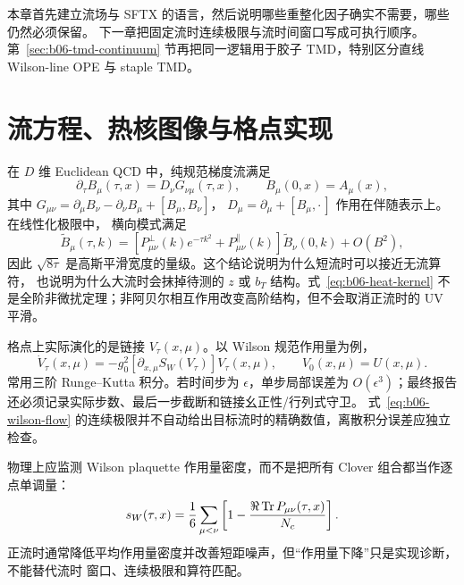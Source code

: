 本章首先建立流场与 SFTX 的语言，然后说明哪些重整化因子确实不需要，哪些仍然必须保留。
下一章把固定流时连续极限与流时间窗口写成可执行顺序。第~\ref{sec:b06-tmd-continuum}
节再把同一逻辑用于胶子 TMD，特别区分直线 Wilson-line OPE 与 staple TMD。

\section{流方程、热核图像与格点实现}

在 \(D\) 维 Euclidean QCD 中，纯规范梯度流满足
\begin{equation}
  \partial_\tau B_\mu(\tau,x)
  =D_\nu G_{\nu\mu}(\tau,x),
  \qquad B_\mu(0,x)=A_\mu(x),
  \label{eq:b06-flow-equation}
\end{equation}
其中 \(G_{\mu\nu}=\partial_\mu B_\nu-\partial_\nu B_\mu+[B_\mu,B_\nu]\)，
\(D_\mu=\partial_\mu+[B_\mu,\cdot\,]\) 作用在伴随表示上。在线性化极限中，
横向模式满足
\begin{equation}
  \widetilde B_\mu(\tau,k)
  =\left[P^\perp_{\mu\nu}(k)e^{-\tau k^2}
  +P^\parallel_{\mu\nu}(k)\right]\widetilde B_\nu(0,k)
  +O(B^2),
  \label{eq:b06-heat-kernel}
\end{equation}
因此 \(\sqrt{8\tau}\) 是高斯平滑宽度的量级。这个结论说明为什么短流时可以接近无流算符，
也说明为什么大流时会抹掉待测的 \(z\) 或 \(b_T\) 结构。式~\eqref{eq:b06-heat-kernel}
不是全阶非微扰定理；非阿贝尔相互作用改变高阶结构，但不会取消正流时的 UV 平滑。

格点上实际演化的是链接 \(V_\tau(x,\mu)\)。以 Wilson 规范作用量为例，
\begin{equation}
  \dot V_\tau(x,\mu)
  =-g_0^2\left[\partial_{x,\mu}S_W(V_\tau)\right]V_\tau(x,\mu),
  \qquad V_0(x,\mu)=U(x,\mu).
  \label{eq:b06-wilson-flow}
\end{equation}
常用三阶 Runge--Kutta 积分。若时间步为 \(\epsilon\)，单步局部误差为
\(O(\epsilon^3)\)；最终报告还必须记录实际步数、最后一步截断和链接幺正性/行列式守卫。
式~\eqref{eq:b06-wilson-flow} 的连续极限并不自动给出目标流时的精确数值，离散积分误差应独立
检查。

物理上应监测 Wilson plaquette 作用量密度，而不是把所有 Clover 组合都当作逐点单调量：
\begin{equation}
  s_W(\tau,x)=\frac16\sum_{\mu<\nu}
  \left[1-\frac{\Re\operatorname{Tr} P_{\mu\nu}(\tau,x)}{N_c}\right].
  \label{eq:b06-plaquette-density}
\end{equation}
正流时通常降低平均作用量密度并改善短距噪声，但“作用量下降”只是实现诊断，不能替代流时
窗口、连续极限和算符匹配。

